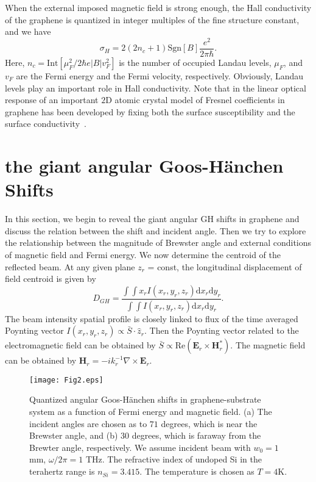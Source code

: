 \documentclass[twocolumn,showpacs,preprintnumbers,amsmath,amssymb]{revtex4}
\begin{document}
When the external imposed magnetic field is strong enough,
the Hall conductivity of the graphene is quantized in integer
multiples of the fine structure constant, and we have~\cite{Kamp2016}
\begin{equation}
\sigma_H=2(2n_c+1)\mathrm{Sgn}[B]\frac{e^2}{2\pi\hbar}\label{HallC}.
\end{equation}
Here, $n_c=\mathrm{Int}[\mu^2_F/2\hbar e|B|v^2_F]$
is the number of occupied Landau levels, $\mu_F$, and $v_F$ are the Fermi energy and the Fermi velocity, respectively.
Obviously, Landau levels play an important role in Hall conductivity.
Note that in the linear optical response of an important $2$D atomic crystal model
of Fresnel coefficients in graphene has been developed by fixing both the surface susceptibility and the
surface conductivity~\cite{Merano2016I}.



\section{the giant angular Goos-H\"{a}nchen Shifts}\label{SecIII}
In this section, we begin to reveal the giant angular GH shifts
in graphene and discuss the relation between the shift and incident
angle. Then we try to explore the relationship between the magnitude of
Brewster angle and external conditions of magnetic field
and Fermi energy.
We now determine the centroid of the reflected beam. At any given plane $z_r$ = const, the longitudinal displacement of field
centroid is given by
\begin{equation}
D_{GH} = \frac{\int \int x_r I(x_r,y_r,z_r)\text{d}x_r \text{d}y_r}{\int \int I(x_r,y_r,z_r)\text{d}x_r \text{d}y_r}.\label{centroid}
\end{equation}
The beam intensity spatial profile is closely linked to flux of the time averaged Poynting vector $I(x_r,y_r,z_r)\propto \bar{S}\cdot \hat{z}_r$.
Then the Poynting vector related to the electromagnetic
field can be obtained by $\bar{S}\propto \mathrm{Re}(\mathbf{E}_{r}\times\mathbf{H}_{r}^*)$.
The magnetic field can be obtained by $\mathbf{H}_r=-ik_{r}^{-1}\nabla\times \mathbf{E}_r$.

\begin{figure}
\centerline{\texttt{[image: Fig2.eps]}}
\caption{\label{Fig2} Quantized angular Goos-H\"{a}nchen shifts
in graphene-substrate system as
a function of Fermi energy and magnetic field.
(a) The incident angles are chosen as to $71$ degrees, which is near the Brewster angle,
and (b) $30$ degrees, which is faraway from the Brewter angle, respectively.
We assume incident beam with $w_0=1$ mm, $\omega/2\pi =1$ THz. The refractive index of undoped Si
in the terahertz range is $n_{Si}=3.415$.
The temperature is chosen as $T=4\mathrm{K}$.}
\end{figure}
\end{document}
